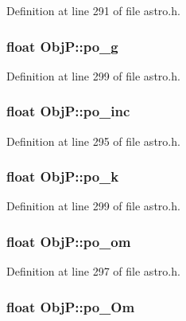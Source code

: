 Definition at line 291 of file astro.\-h.

\hypertarget{struct_obj_p_a7c7ec666c7ba61378242bb981a2fa757}{
\subsubsection[{po\-\_\-g}]{\setlength{\rightskip}{0pt plus 5cm}float Obj\-P\-::po\-\_\-g}}\label{struct_obj_p_a7c7ec666c7ba61378242bb981a2fa757}


Definition at line 299 of file astro.\-h.

\hypertarget{struct_obj_p_a71353598d3fe9268ce8c899e12b600e1}{
\subsubsection[{po\-\_\-inc}]{\setlength{\rightskip}{0pt plus 5cm}float Obj\-P\-::po\-\_\-inc}}\label{struct_obj_p_a71353598d3fe9268ce8c899e12b600e1}


Definition at line 295 of file astro.\-h.

\hypertarget{struct_obj_p_a5195b4c594babe171ed9771cf3c2c39c}{
\subsubsection[{po\-\_\-k}]{\setlength{\rightskip}{0pt plus 5cm}float Obj\-P\-::po\-\_\-k}}\label{struct_obj_p_a5195b4c594babe171ed9771cf3c2c39c}


Definition at line 299 of file astro.\-h.

\hypertarget{struct_obj_p_a9c8978a19f95ca5c35d7d1c5e8e066a0}{
\subsubsection[{po\-\_\-om}]{\setlength{\rightskip}{0pt plus 5cm}float Obj\-P\-::po\-\_\-om}}\label{struct_obj_p_a9c8978a19f95ca5c35d7d1c5e8e066a0}


Definition at line 297 of file astro.\-h.

\hypertarget{struct_obj_p_a4c734adac4a3687e537367dadb760404}{
\subsubsection[{po\-\_\-\-Om}]{\setlength{\rightskip}{0pt plus 5cm}float Obj\-P\-::po\-\_\-\-Om}}\label{struct_obj_p_a4c734adac4a3687e537367dadb760404}


